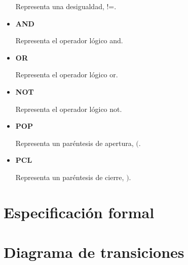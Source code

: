 \documentclass[\main/MemoriaPL.tex]{subfiles}
\begin{document}
\begin{itemize}
            \par
            Representa una desigualdad, !=.
      \item \textbf{AND}
            \par
            Representa el operador lógico and.
      \item \textbf{OR}
            \par
            Representa el operador lógico or.
      \item \textbf{NOT}
            \par
            Representa el operador lógico not.
      \item \textbf{POP}
            \par
            Representa un paréntesis de apertura, $($.
      \item \textbf{PCL}
            \par
            Representa un paréntesis de cierre, $)$.
    \end{itemize}

  \section{Especificación formal} %


  \section{Diagrama de transiciones} %
\end{document}
